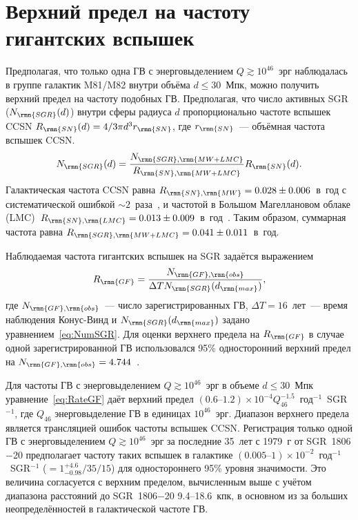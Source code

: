 \section{Верхний предел на частоту гигантских вспышек}\label{GF_rate}
Предполагая, что только одна ГВ с энерговыделением $Q \gtrsim 10^{46}$~эрг наблюдалась 
в группе галактик M81/M82 внутри объёма $d \le 30$~Мпк, можно получить верхний предел 
на частоту подобных ГВ. Предполагая, что число активных SGR ($N_{\rmn{SGR}}(d)$) 
внутри сферы радиуса $d$ пропорционально частоте вспышек CCSN 
$R_{\rmn{SN}}(d)=4/3 \pi d^3 r_{\rmn{SN}}$, где $r_{\rmn{SN}}$~--- объёмная частота вспышек CCSN.
\begin{equation}\label{eq:NumSGR}
N_{\rmn{SGR}} (d) = \frac{N_{\rmn{SGR}, \rmn{MW+LMC}}}{ R_{\rmn{SN}, \rmn{MW+LMC}}} R_{\rmn{SN}}(d).
\end{equation}
Галактическая частота CCSN равна $R_{\rmn{SN}, \rmn{MW}} = 0.028\pm0.006$~в~год 
с систематической ошибкой $\sim 2$~раза~\citep{Li2011part3}, и частотой в Большом 
Магеллановом облаке (LMC)~$R_{\rmn{SN}, \rmn{LMC}} = 0.013\pm0.009$~в~год~\citep{Bergh1991}. 
Таким образом, суммарная частота равна $R_{\rmn{SGR}, \rmn{MW+LMC}} = 0.041\pm0.011$~в~год. 

Наблюдаемая частота гигантских вспышек на SGR задаётся выражением
\begin{equation}\label{eq:RateGF}
R_{\rmn{GF}} = \frac{N_{\rmn{GF},\rmn{obs}}}{\Delta T N_{\rmn{SGR}}(d_{\rmn{max}})} ,
\end{equation}
где $N_{\rmn{GF},\rmn{obs}}$~--- число зарегистрированных ГВ, 
$\Delta T=16$~лет~--- время наблюдения Конус-Винд и $N_{\rmn{SGR}}(d_{\rmn{max}})$ 
задано уравнением~\ref{eq:NumSGR}. Для оценки верхнего предела на $R_{\rmn{GF}}$ 
в случае одной зарегистрированной ГВ использовался 95\% односторонний верхний предел
на $N_{\rmn{GF}, \rmn{obs}}=4.744$~\citep{Gehrels1986}.

Для частоты ГВ с энерговыделением $Q \gtrsim 10^{46}$~эрг в объеме $d\le30$~Мпк уравнение~\ref{eq:RateGF} 
даёт верхний предел ${(0.6\textrm{--}1.2)\times 10^{-4} Q_{46}^{-1.5}}$~год$^{-1}$~SGR$^{-1}$, 
где $Q_{46}$ энерговыделение ГВ в единицах $10^{46}$~эрг. Диапазон верхнего предела 
является трансляцией ошибок частоты вспышек CCSN. Регистрация только 
одной ГВ с энерговыделением $Q \gtrsim 10^{46}$~эрг за последние 35~лет 
с 1979~г от SGR~1806$-$20 предполагает частоту таких вспышек в галактике 
${(0.005\textrm{--}1)\times 10^{-2}}$~год$^{-1}$~SGR$^{-1}$ ($=1_{-0.98}^{+4.6} / 35 / 15 $) 
для одностороннего 95\% уровня значимости. Это величина согласуется с верхним пределом, 
вычисленным выше с учётом диапазона расстояний до SGR~1806$-$20 9.4--18.6~кпк, 
в основном из за больших неопределённостей в галактической частоте ГВ. 

